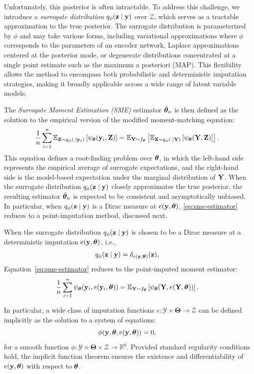 \documentclass[twoside,11pt]{article}
\begin{document}
Unfortunately, this posterior is often intractable. To address this challenge, we introduce a \emph{surrogate distribution} $q_\phi({\bf z} \mid {\bf y})$ over $\mathcal{Z}$, which serves as a tractable approximation to the true posterior. The surrogate distribution is parameterized by $\phi$ and may take various forms, including variational approximations where $\phi$ corresponds to the parameters of an encoder network, Laplace approximations centered at the posterior mode, or degenerate distributions concentrated at a single point estimate such as the maximum a posteriori (MAP). This flexibility allows the method to encompass both probabilistic and deterministic imputation strategies, making it broadly applicable across a wide range of latent variable models.

The \emph{Surrogate Moment Estimation (SME)} estimator $\hat{{\bm{\theta}}}_n$ is then defined as the solution to the empirical version of the modified moment-matching equation:
\begin{equation}
\frac{1}{n} \sum_{i=1}^n \mathbb{E}_{{\bf Z} \sim q_\phi(\cdot \mid {\bf y}_i)} \left[ \psi_{\bm{\theta}}({\bf y}_i, {\bf Z}) \right]
=
\mathbb{E}_{{\bf Y} \sim f_{\bm{\theta}}}
\left[
\mathbb{E}_{{\bf Z} \sim q_\phi(\cdot \mid {\bf Y})} 
\left[ 
\psi_{\bm{\theta}}({\bf Y}, {\bf Z})
\right]
\right].
\end{equation}
This equation defines a root-finding problem over ${\bm{\theta}}$, in which the left-hand side represents the empirical average of surrogate expectations, and the right-hand side is the model-based expectation under the marginal distribution of ${\bf Y}$. When the surrogate distribution $q_\phi({\bf z} \mid {\bf y})$ closely approximates the true posterior, the resulting estimator $\hat{{\bm{\theta}}}_n$ is expected to be consistent and asymptotically unbiased. In particular, when $q_\phi({\bf z} \mid {\bf y})$ is a Dirac measure at $e({\bf y}, {\bm{\theta}})$, \eqref{eq:sme-estimator} reduces to a point-imputation method, discussed next.





When the surrogate distribution $q_\phi({\bf z} \mid {\bf y})$ is chosen to be a Dirac measure at a deterministic imputation $e({\bf y}, {\bm{\theta}})$, i.e.,
\[
q_\phi({\bf z} \mid {\bf y}) = \delta_{e({\bf y}, {\bm{\theta}})}({\bf z}),
\]
Equation~\eqref{eq:sme-estimator} reduces to the point-imputed moment estimator:
\begin{equation}
\label{eq:imputed-estimator}
\frac{1}{n} \sum_{i=1}^n \psi_{\bm{\theta}}({\bf y}_i, e({\bf y}_i, {\bm{\theta}})) 
= 
\mathbb{E}_{{\bf Y} \sim f_{\bm{\theta}}} 
\left[ 
\psi_{\bm{\theta}}({\bf Y}, e({\bf Y}, {\bm{\theta}})) 
\right].
\end{equation}

In particular, a wide class of imputation functions $e : \mathcal{Y} \times \bm{\Theta} \to \mathcal{Z}$ can be defined implicitly as the solution to a system of equations:
\begin{equation}
\label{def:e:implicit}
\phi({\bf y}, {\bm{\theta}}, e({\bf y}, {\bm{\theta}})) = 0,
\end{equation}
for a smooth function $\phi : \mathcal{Y} \times \bm{\Theta} \times \mathcal{Z} \to \mathbb{R}^q$. Provided standard regularity conditions hold, the implicit function theorem ensures the existence and differentiability of $e({\bf y}, {\bm{\theta}})$ with respect to ${\bm{\theta}}$.
\end{document}
